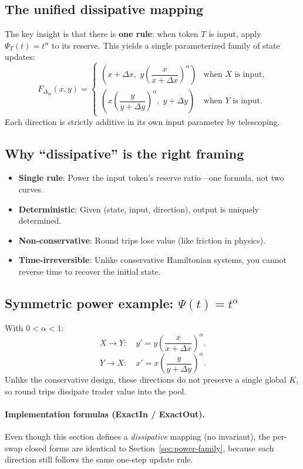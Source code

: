 \documentclass[11pt]{article}
\theoremstyle{definition}
\theoremstyle{remark}
\newcommand{\dx}{\Delta x}
\newcommand{\dy}{\Delta y}
\begin{document}
\subsection{The unified dissipative mapping}

The key insight is that there is \textbf{one rule}: when token $T$ is input, apply $\Psi_T(t)=t^\alpha$ to its reserve.
This yields a single parameterized family of state updates:
\[
\boxed{F_{\Delta_{\mathrm{in}}}(x,y)=\begin{cases}
\left(x+\dx,\;y\left(\dfrac{x}{x+\dx}\right)^\alpha\right) & \text{when $X$ is input,}\\[1em]
\left(x\left(\dfrac{y}{y+\dy}\right)^\alpha,\;y+\dy\right) & \text{when $Y$ is input.}
\end{cases}}
\]
Each direction is strictly additive in its own input parameter by telescoping.

\subsection{Why ``dissipative'' is the right framing}

\begin{itemize}
\item \textbf{Single rule}: Power the input token's reserve ratio---one formula, not two curves.
\item \textbf{Deterministic}: Given (state, input, direction), output is uniquely determined.
\item \textbf{Non-conservative}: Round trips lose value (like friction in physics).
\item \textbf{Time-irreversible}: Unlike conservative Hamiltonian systems, you cannot reverse time to recover the initial state.
\end{itemize}

\subsection{Symmetric power example: $\Psi(t)=t^\alpha$}

With $0<\alpha<1$:
\[
X\to Y:\quad y' = y\left(\frac{x}{x+\dx}\right)^\alpha.
\]
\[
Y\to X:\quad x' = x\left(\frac{y}{y+\dy}\right)^\alpha.
\]
Unlike the conservative design, these directions do not preserve a single global $K$, so round trips dissipate trader value into the pool.


\paragraph{Implementation formulas (ExactIn / ExactOut).}
Even though this section defines a \emph{dissipative} mapping (no invariant), the per-swap
closed forms are identical to Section~\ref{sec:power-family}, because each direction still follows the same one-step
update rule.
\end{document}
